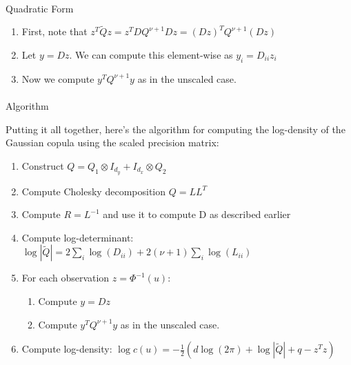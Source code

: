 \documentclass[
  letterpaper,
  DIV=11,
  numbers=noendperiod]{scrartcl}
\makeatletter
\let\oldparagraph\paragraph
\renewcommand{\paragraph}{
    \@ifstar
      \xxxParagraphStar
      \xxxParagraphNoStar
  }
\newcommand{\xxxParagraphStar}[1]{\oldparagraph*{#1}\mbox{}}
\newcommand{\xxxParagraphNoStar}[1]{\oldparagraph{#1}\mbox{}}
\providecommand{\tightlist}{%
  \setlength{\itemsep}{0pt}\setlength{\parskip}{0pt}}\usepackage{longtable,booktabs,array}
\makeatother
\begin{document}
\paragraph{Quadratic Form}\label{quadratic-form}

\begin{enumerate}
\def\labelenumi{\arabic{enumi}.}
\tightlist
\item
  First, note that
  \(z^T\tilde{Q}z = z^TDQ^{\nu+1}Dz = (Dz)^TQ^{\nu+1}(Dz)\)
\item
  Let \(y = Dz\). We can compute this element-wise as
  \(y_i = D_{ii}z_i\)
\item
  Now we compute \(y^TQ^{\nu+1}y\) as in the unscaled case.
\end{enumerate}

\paragraph{Algorithm}\label{algorithm-1}

Putting it all together, here's the algorithm for computing the
log-density of the Gaussian copula using the scaled precision matrix:

\begin{enumerate}
\def\labelenumi{\arabic{enumi}.}
\tightlist
\item
  Construct \(Q = Q_1 \otimes I_{d_y} + I_{d_x} \otimes Q_2\)
\item
  Compute Cholesky decomposition \(Q = LL^T\)
\item
  Compute \(R = L^{-1}\) and use it to compute D as described earlier
\item
  Compute log-determinant:
  \(\log|\tilde{Q}| = 2\sum_i \log(D_{ii}) + 2(\nu+1)\sum_i \log(L_{ii})\)
\item
  For each observation \(z = \Phi^{-1}(u)\):

  \begin{enumerate}
  \def\labelenumii{\roman{enumii})}
  \tightlist
  \item
    Compute \(y = Dz\)
  \item
    Compute \(y^TQ^{\nu+1}y\) as in the unscaled case.
  \end{enumerate}
\item
  Compute log-density:
  \(\log c(u) = -\frac{1}{2}(d\log(2\pi) + \log|\tilde{Q}| + q - z^Tz)\)
\end{enumerate}
\end{document}
